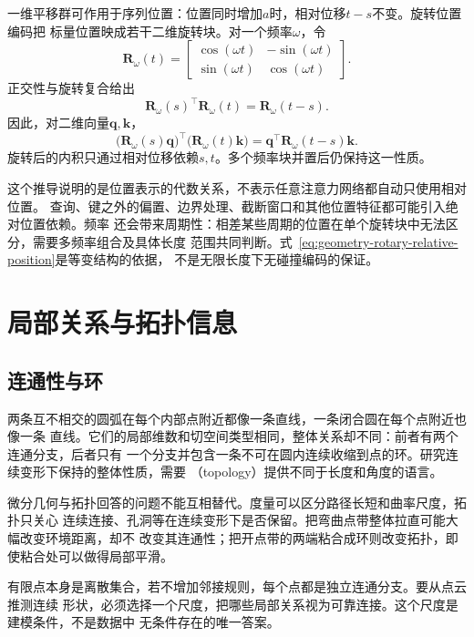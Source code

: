 一维平移群可作用于序列位置：位置同时增加$a$时，相对位移$t-s$不变。旋转位置编码把
标量位置映成若干二维旋转块。对一个频率$\omega$，令
\[
  \bm{R}_{\omega}(t)
  =
  \begin{bmatrix}
    \cos(\omega t)&-\sin(\omega t)\\
    \sin(\omega t)&\cos(\omega t)
  \end{bmatrix}.
\]
正交性与旋转复合给出
\begin{equation}
  \bm{R}_{\omega}(s)^{\top}\bm{R}_{\omega}(t)
  =
  \bm{R}_{\omega}(t-s).
  \label{eq:geometry-rotary-relative-position}
\end{equation}
因此，对二维向量$\bm{q},\bm{k}$，
\begin{equation}
  \bigl(\bm{R}_{\omega}(s)\bm{q}\bigr)^{\top}
  \bigl(\bm{R}_{\omega}(t)\bm{k}\bigr)
  =
  \bm{q}^{\top}\bm{R}_{\omega}(t-s)\bm{k}.
  \label{eq:geometry-rotary-dot-product}
\end{equation}
旋转后的内积只通过相对位移依赖$s,t$。多个频率块并置后仍保持这一性质。

这个推导说明的是位置表示的代数关系，不表示任意注意力网络都自动只使用相对位置。
查询、键之外的偏置、边界处理、截断窗口和其他位置特征都可能引入绝对位置依赖。频率
还会带来周期性：相差某些周期的位置在单个旋转块中无法区分，需要多频率组合及具体长度
范围共同判断。式~\eqref{eq:geometry-rotary-relative-position}是等变结构的依据，
不是无限长度下无碰撞编码的保证。

\section{局部关系与拓扑信息}
\label{sec:geometry-local-relations-topology}

\subsection{连通性与环}

两条互不相交的圆弧在每个内部点附近都像一条直线，一条闭合圆在每个点附近也像一条
直线。它们的局部维数和切空间类型相同，整体关系却不同：前者有两个连通分支，后者只有
一个分支并包含一条不可在圆内连续收缩到点的环。研究连续变形下保持的整体性质，需要
（topology）提供不同于长度和角度的语言。

微分几何与拓扑回答的问题不能互相替代。度量可以区分路径长短和曲率尺度，拓扑只关心
连续连接、孔洞等在连续变形下是否保留。把弯曲点带整体拉直可能大幅改变环境距离，却不
改变其连通性；把开点带的两端粘合成环则改变拓扑，即使粘合处可以做得局部平滑。

有限点本身是离散集合，若不增加邻接规则，每个点都是独立连通分支。要从点云推测连续
形状，必须选择一个尺度，把哪些局部关系视为可靠连接。这个尺度是建模条件，不是数据中
无条件存在的唯一答案。


